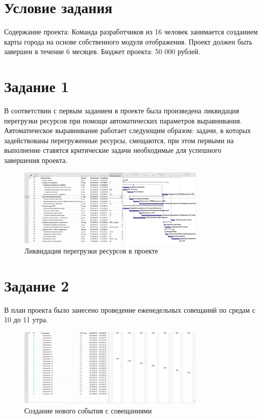 \section{Условие задания}

Содержание проекта: Команда разработчиков из 16 человек занимается созданием карты города на основе собственного модуля отображения. Проект должен быть завершен в течение 6 месяцев. Бюджет проекта: 50 000 рублей.

\section{Задание 1}

В соответствии с первым заданием в проекте была произведена ликвидация перегрузки ресурсов при помощи автоматических параметров выравнивания. Автоматическое выравнивание работает следующим образом: задачи, в которых задействованы перегруженные ресурсы, смещаются, при этом первыми на выполнение ставятся критические задачи необходимые для успешного завершения проекта.

\begin{figure}[H]
    \centering
    \includegraphics[width=0.8\textwidth]{img/content/task_1.png}
    \caption{Ликвидация перегрузки ресурсов в проекте}
    \label{fig:task_1}
\end{figure}

\section{Задание 2}

В план проекта было занесено проведение еженедельных совещаний по средам с 10 до 11 утра.

\begin{figure}[H]
    \centering
    \includegraphics[width=0.8\textwidth]{img/content/task_2.png}
    \caption{Создание нового события с совещаниями}
    \label{fig:task_2}
\end{figure}

